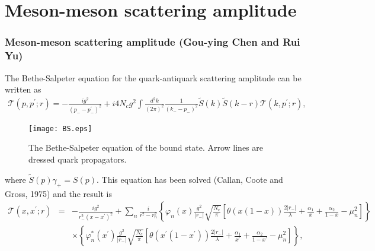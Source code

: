 \documentclass[8pt]{beamer}
\begin{document}
\section{Meson-meson scattering amplitude}
\begin{frame}
	\frametitle{Meson-meson scattering amplitude (Gou-ying Chen and Rui Yu)}
	The Bethe-Salpeter equation for the quark-antiquark scattering amplitude can be written as
	\begin{eqnarray}
		\mathcal{T}(p,p^\prime;r)=-\frac{ig^2}{(p_{-}-p_{-}^\prime)^2}
		+i4N_c
		g^2\int\frac{d^2k}{(2\pi)^2}\frac{1}{(k_{-}-p_{-})^2}\tilde{S}(k)\tilde{S}(k-r)\mathcal{T}(k,p^\prime;r),\label{quarkeq}
	\end{eqnarray}
	\begin{figure}[hbt]
		\begin{center}
			\texttt{[image: BS.eps]}\\
			\caption{The Bethe-Salpeter equation of the bound state. Arrow lines are dressed quark propagators.}\label{BSequation}
		\end{center}
	\end{figure}
    where $\tilde{S}(p)\gamma_+=S(p)$. This equation has been solved (Callan, Coote and Gross, 1975) and the result is
    \small
	\begin{eqnarray}
		\mathcal{T}(x,x^\prime;r)
		&=&-\frac{ig^2}{r_{-}^2(x-x^\prime)^2}+\sum_{n}\frac{i}{r^2-r_{n}^2}\left\{\varphi_{n}(x)\frac{g^2}{|r_{-}|}
		\sqrt{\frac{N_c}{\pi}}\left[\theta(x(1-x))\frac{2|r_{-}|}{\lambda}+\frac{\alpha_1}{x}+\frac{\alpha_2}{1-x}-\mu_{n}^2\right]\right\}\nonumber\\
		&&\times\left\{\varphi_n^{\ast}(x^\prime)\frac{g^2}{|r_{-}|}\sqrt{\frac{N_c}{\pi}}
		\left[\theta(x^\prime(1-x^\prime))\frac{2|r_{-}|}{\lambda}+\frac{\alpha_1}{x^\prime}+\frac{\alpha_2}{1-x^\prime}-\mu_n^2\right]\right\},\label{qqamp}
    \end{eqnarray}
    \normalsize
\end{frame}
\end{document}
